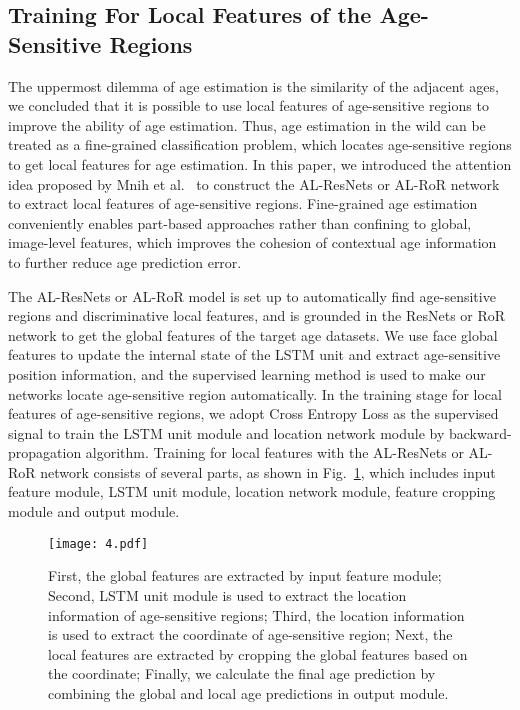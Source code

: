 \documentclass[journal]{IEEEtran}
\begin{document}
\subsection{Training For Local Features of the Age-Sensitive Regions}
The uppermost dilemma of age estimation is the similarity of the adjacent ages, we concluded that it is possible to use local features of age-sensitive regions to improve the ability of age estimation. Thus, age estimation in the wild can be treated as a fine-grained classification problem, which locates age-sensitive regions to get local features for age estimation. In this paper, we introduced the attention idea proposed by Mnih et al.~\cite{ref-27} to construct the AL-ResNets or AL-RoR network to extract local features of age-sensitive regions. Fine-grained age estimation conveniently enables part-based approaches rather than confining to global, image-level features, which improves the cohesion of contextual age information to further reduce age prediction error.
\par
The AL-ResNets or AL-RoR model is set up to automatically find age-sensitive regions and discriminative local features, and is grounded in the ResNets or RoR network to get the global features of the target age datasets. We use face global features to update the internal state of the LSTM unit and extract age-sensitive position information, and the supervised learning method is used to make our networks locate age-sensitive region automatically. In the training stage for local features of age-sensitive regions, we adopt Cross Entropy Loss as the supervised signal to train the LSTM unit module and location network module by backward-propagation algorithm. Training for local features with  the AL-ResNets or AL-RoR network consists of several parts, as shown in Fig.~\ref{fig:local-training}, which includes input feature module, LSTM unit module, location network module, feature cropping module and output module.
\begin{figure}
\centering
\texttt{[image: 4.pdf]}
\caption{First, the global features are extracted by input feature module; Second, LSTM unit module is used to extract the location information of age-sensitive regions; Third, the location information is used to extract the coordinate of age-sensitive region; Next, the local features are extracted by cropping the global features based on the coordinate; Finally, we calculate the final age prediction by combining the global and local age predictions in output module.}
\label{fig:local-training}
\end{figure}
\end{document}
